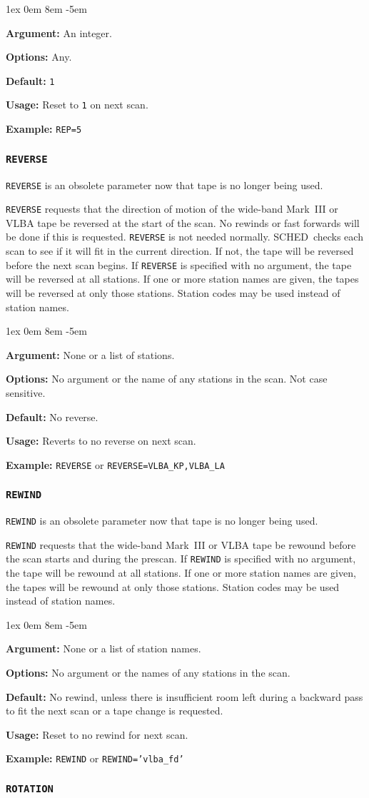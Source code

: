 \documentclass{report}
\newcommand{\schedb}{{\sc SCHED~}}
\newcommand{\rcwbox}[5]{
  \begin{list}{}{\parsep 1ex  \itemsep 0em
                 \leftmargin 8em  \itemindent -5em }
    \item {\bf Argument:} #1
    \item {\bf Options:}  #2
    \item {\bf Default:}  #3
    \item {\bf Usage:}    #4
    \item {\bf Example:}  #5
  \end{list}
}
\begin{document}
\rcwbox
{An integer.}
{Any.}
{{\tt 1}}
{Reset to {\tt 1} on next scan.}
{{\tt REP=5}}


\subsubsection{\label{MP:REVERSE}{\tt REVERSE}}

{\tt REVERSE} is an obsolete parameter now that tape is no longer
being used.

{\tt REVERSE} requests that the direction of motion of the
wide-band Mark~III or VLBA tape be reversed at the start of the
scan. No rewinds or fast forwards will be done if this is requested.
{\tt REVERSE} is not needed normally. \schedb checks each scan to
see if it will fit in the current direction. If not, the tape will be
reversed before the next scan begins.
If {\tt REVERSE} is specified with no argument, the tape will be
reversed at all stations. If one or more station names are given, the
tapes will be reversed at only those stations.  Station codes may
be used instead of station names.

\rcwbox
{None or a list of stations.}
{No argument or the name of any stations in the scan. Not case
sensitive.}
{No reverse.}
{Reverts to no reverse on next scan.}
{{\tt REVERSE} or {\tt REVERSE=VLBA\_KP,VLBA\_LA}}


\subsubsection{\label{MP:REWIND}{\tt REWIND}}

{\tt REWIND} is an obsolete parameter now that tape is no longer
being used.

{\tt REWIND} requests that the wide-band Mark~III or VLBA
tape be rewound before the scan starts and during the prescan.  If
{\tt REWIND} is specified with no argument, the tape will be rewound
at all stations. If one or more station names are given, the tapes
will be rewound at only those stations.  Station codes may be used
instead of station names.

\rcwbox
{None or a list of station names.}
{No argument or the names of any stations in the scan.}
{No rewind, unless there is insufficient room left during a backward
pass to fit the next scan or a tape change is requested.}
{Reset to no rewind for next scan.}
{{\tt REWIND} or {\tt REWIND='vlba\_fd'}}


\subsubsection{\label{MP:ROTATION}\tt ROTATION}
\end{document}
